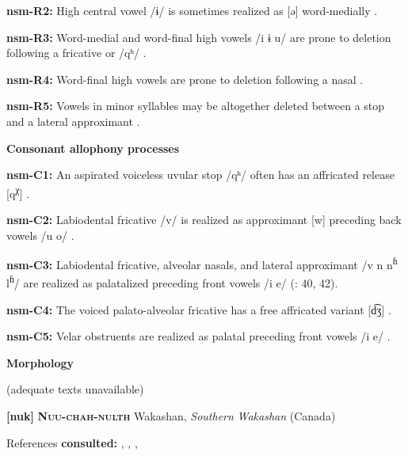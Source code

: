 \textbf{nsm-R2:} High central vowel /ɨ/ is sometimes realized as [ə] word-medially \citep[45]{Teo2009}.



\textbf{nsm-R3:} Word-medial and word-final high vowels /i ɨ u/ are prone to deletion following a fricative or /qʰ/ \citep[66]{Teo2009}.



\textbf{nsm-R4:} Word-final high vowels are prone to deletion following a nasal \citep[369]{Teo2012}.



\textbf{nsm-R5:} Vowels in minor syllables may be altogether deleted between a stop and a lateral approximant \citep[370]{Teo2012}.



\textbf{Consonant allophony processes}



\textbf{nsm-C1:} An aspirated voiceless uvular stop /qʰ/ often has an affricated release [q\textsuperscript{χ}] \citep[39]{Teo2009}.



\textbf{nsm-C2:} Labiodental fricative /v/ is realized as approximant [w] preceding back vowels /u o/ \citep[39]{Teo2009}.



\textbf{nsm-C3:} Labiodental fricative, alveolar nasals, and lateral approximant /v n n\textsuperscript{ɦ} l\textsuperscript{ɦ}/ are realized as palatalized preceding front vowels /i e/ (\citealt{Teo2009}: 40, 42).



\textbf{nsm-C4:} The voiced palato-alveolar fricative has a free affricated variant [d͡ʒ] \citep[40]{Teo2009}.



\textbf{nsm-C5:} Velar obstruents are realized as palatal preceding front vowels /i e/ \citep[368]{Teo2012}.



\textbf{Morphology}



(adequate texts unavailable)



\textbf{[nuk]}   \textbf{\textsc{Nuu-chah-nulth}}  Wakashan, \textit{Southern} \textit{Wakashan} (Canada)



References \textbf{consulted:} \citet{CarlsonEtAl2001}, \citet{Kim2003}, \citet{Rose1981}, \citet{Stonham1999}



